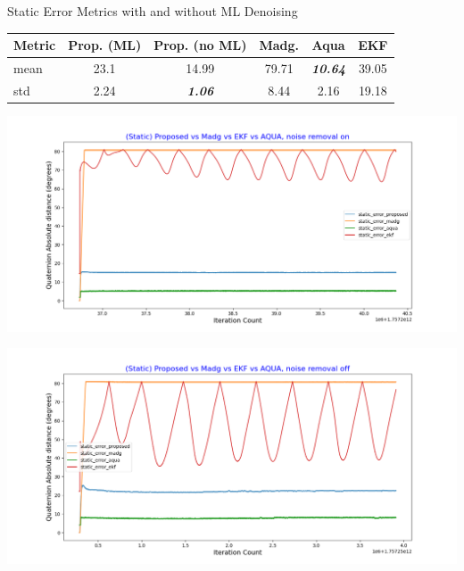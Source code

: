 \documentclass[aspectratio=169,xcolor=dvipsnames]{beamer}
\begin{document}
\begin{frame}{Static Error Metrics with and without ML Denoising}
\small
\begin{minipage}{\textwidth}
  \centering
  \scriptsize
  \label{tab:static_ml}
  \begin{tabular}{lccccc}
    \toprule
    Metric & Prop. (ML) & Prop. (no ML) & Madg. & Aqua & EKF \\
    \midrule
    mean  & 23.1  & 14.99 & 79.71 & \textit{\textbf{10.64}} & 39.05  \\
    std   & 2.24  & \textit{\textbf{1.06}} & 8.44 & 2.16 & 19.18  \\
    \bottomrule
  \end{tabular}
\end{minipage}

\vspace{0.5cm}

\begin{minipage}{0.5\textwidth}
  \centering
  \includegraphics[width=\linewidth]{graphs/static_ml.png}
\end{minipage}%
\hfill
\begin{minipage}{0.5\textwidth}
  \centering
  \includegraphics[width=\linewidth]{graphs/static_no_ml.png}
\end{minipage}

\end{frame}
\end{document}
